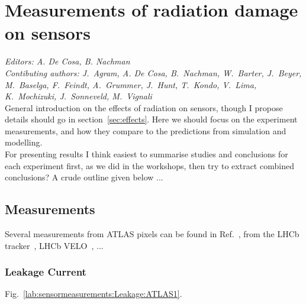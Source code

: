 \section{Measurements of radiation damage on sensors}
\label{sec:measurements}
{\it Editors: A. De Cosa, B. Nachman}  \\
{\it Contibuting authors: J.~Agram, A. De Cosa, B.~Nachman, W.~Barter, J.~Beyer, M.~Baselga, F.~Feindt, A.~Grummer, J.~Hunt, T.~Kondo, V.~Lima, K.~Mochizuki, J.~Sonneveld, M.~Vignali}  \\

\noindent 
General introduction on the effects of radiation on sensors, though I propose details should go in section~\ref{sec:effects}. Here we should focus on the experiment measurements, and how they compare to the predictions from simulation and modelling. \\
For presenting results I think easiest to summarise studies and conclusions for each experiment first, as we did in the workshops, then try to extract combined conclusions? A crude outline given below ...

\subsection{Measurements}

Several measurements from ATLAS pixels can be found in Ref.~\cite{Aaboud:2019wgd}, from the LHCb tracker~\cite{AbellanBeteta:2018wif}, LHCb VELO~\cite{Akiba:2633496}, ...

\subsubsection{Leakage Current}

Fig.~\ref{lab:sensormeasurements:Leakage:ATLAS1}.

